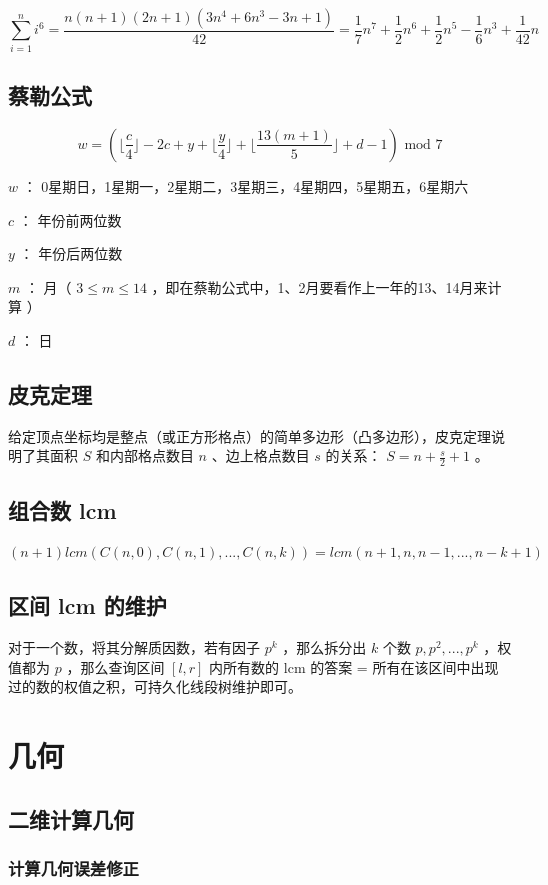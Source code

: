 \documentclass{article}
\begin{document}
$$\sum\limits_{i=1}^{n}i^6 = \frac{n(n+1)(2n+1)(3n^4+6n^3-3n+1)}{42} = \frac{1}{7}n^7 + \frac{1}{2}n^6 + \frac{1}{2}n^5 - \frac{1}{6}n^3 + \frac{1}{42}n$$


\subsection{蔡勒公式}

$$w = (\lfloor \frac{c}{4} \rfloor - 2c + y + \lfloor \frac{y}{4} \rfloor + \lfloor \frac{13(m+1)}{5} \rfloor + d - 1) \text{ mod } 7$$

$w$ ： 0星期日，1星期一，2星期二，3星期三，4星期四，5星期五，6星期六

$c$ ： 年份前两位数

$y$ ： 年份后两位数

$m$ ： 月（ $3 \leq m \leq 14$ ，即在蔡勒公式中，1、2月要看作上一年的13、14月来计算 ）

$d$ ： 日

\subsection{皮克定理}

给定顶点坐标均是整点（或正方形格点）的简单多边形（凸多边形），皮克定理说明了其面积 $S$ 和内部格点数目 $n$ 、边上格点数目 $s$ 的关系： $S = n + \frac{s}{2} + 1$ 。

\subsection{组合数 lcm}
$(n+1) lcm(C(n, 0), C(n,1),...,C(n,k)) = lcm(n+1, n, n-1, ..., n-k+1)$
\subsection{区间 lcm 的维护}
对于一个数，将其分解质因数，若有因子 $p^k$ ，那么拆分出 $k$ 个数 $p, p^2, ..., p^k$ ，权值都为 $p$ ，那么查询区间 $[l, r]$ 内所有数的 lcm 的答案 = 所有在该区间中出现过的数的权值之积，可持久化线段树维护即可。

\section{几何}

\subsection{二维计算几何}

\subsubsection{计算几何误差修正}
\end{document}
